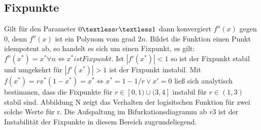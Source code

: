 \documentclass{scrartcl}
\begin{document}
\subsection{Fixpunkte}
Gilt für den Parameter $0 \textless r \textless 1$ dann konvergiert $f^n(x)$ gegen 0, denn $f^n(x)$ ist ein Polynom vom grad $2n$.
Bildet die Funktion einen Punkt idempotent ab, so handelt es sich um einen Fixpunkt, es gilt: $f^n(x^*)=x^* \forall n \iff x^* ist Fixpunkt$. Ist $|f'(x^*)|<1$ so ist der Fixpunkt stabil und umgekehrt für $|f'(x^*)|>1$ ist der Fixpunkt instabil.
Mit 
\begin{math}
f(x^*)=rx^*(1-x^*)=x^*
\iff x^*=1-1/r \vee x'=0
\end{math}
ließ sich analytisch bestimmen, dass die Fixpunkte für $r \in [0,1) \cup (3,4]$ instabil für $r \in (1,3)$ stabil sind.
Abbildung N zeigt das Verhalten der logisitschen Funktion für zwei solche Werte für r. Die Aufspaltung im Bifurkationsdiagramm ab $r 3$ ist der Instabilität der Fixpunkte in diesem Bereich zugrundeliegend.
\end{document}
